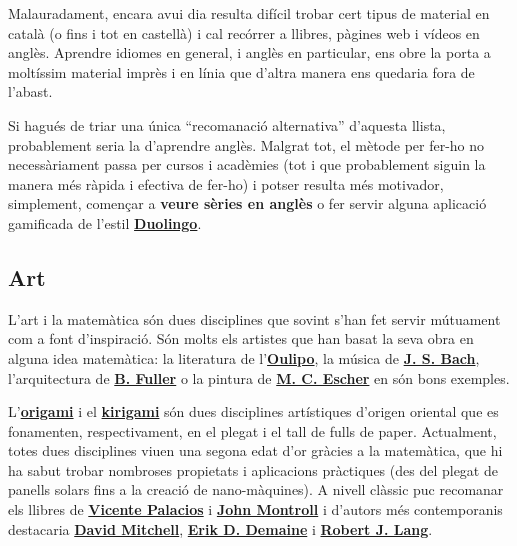 \documentclass[a4paper, 12pt]{article}
\begin{document}
            Malauradament, encara avui dia resulta difícil trobar cert tipus de material en català (o fins i tot en castellà) i cal recórrer a llibres, pàgines web i vídeos en anglès. Aprendre idiomes en general, i anglès en particular, ens obre la porta a moltíssim material imprès i en línia que d'altra manera ens quedaria fora de l'abast.

            Si hagués de triar una única ``recomanació alternativa'' d'aquesta llista, probablement seria la d'aprendre anglès. Malgrat tot, el mètode per fer-ho no necessàriament passa per cursos i acadèmies (tot i que probablement siguin la manera més ràpida i efectiva de fer-ho) i potser resulta més motivador, simplement, començar a \textbf{veure sèries en anglès} o fer servir alguna aplicació gamificada de l'estil \href{https://play.google.com/store/apps/details?id=com.duolingo}{\textbf{Duolingo}}.

        \subsection*{Art}

            L'art i la matemàtica són dues disciplines que sovint s'han fet servir mútuament com a font d'inspiració. Són molts els artistes que han basat la seva obra en alguna idea matemàtica: la literatura de l'\href{https://ca.wikipedia.org/wiki/Oulipo}{\textbf{Oulipo}}, la música de \href{https://ca.wikipedia.org/wiki/Johann_Sebastian_Bach}{\textbf{J. S. Bach}}, l'arquitectura de \href{https://ca.wikipedia.org/wiki/Buckminster_Fuller}{\textbf{B. Fuller}} o la pintura de \href{https://ca.wikipedia.org/wiki/Maurits_Cornelis_Escher}{\textbf{M. C. Escher}} en són bons exemples.

            L'\href{https://ca.wikipedia.org/wiki/Origami}{\textbf{origami}} i el \href{https://en.wikipedia.org/wiki/Kirigami}{\textbf{kirigami}} són dues disciplines artístiques d'origen oriental que es fonamenten, respectivament, en el plegat i el tall de fulls de paper. Actualment, totes dues disciplines viuen una segona edat d'or gràcies a la matemàtica, que hi ha sabut trobar nombroses propietats i aplicacions pràctiques (des del plegat de panells solars fins a la creació de nano-màquines). A nivell clàssic puc recomanar els llibres de \href{https://www.casadellibro.com/libros-ebooks/vicente-palacios/60484}{\textbf{Vicente Palacios}} i \href{https://en.wikipedia.org/wiki/John_Montroll}{\textbf{John Montroll}} i d'autors més contemporanis destacaria \href{http://www.origamiheaven.com/}{\textbf{David Mitchell}}, \href{https://en.wikipedia.org/wiki/Erik_Demaine}{\textbf{Erik D. Demaine}} i \href{https://en.wikipedia.org/wiki/Robert_J._Lang}{\textbf{Robert J. Lang}}.
\end{document}

